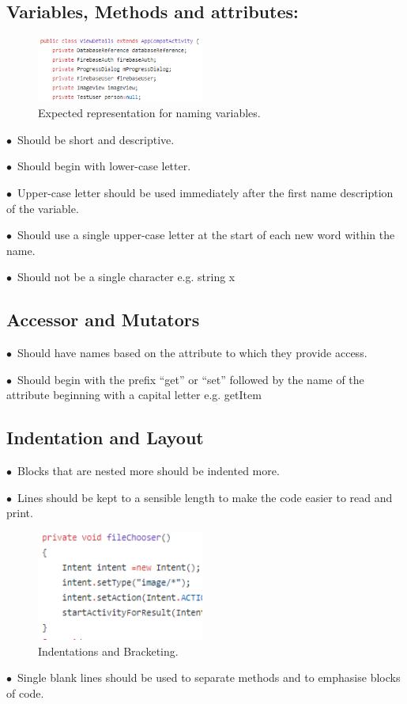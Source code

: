 \documentclass[english]{article}
\begin{document}
		\subsection{Variables, Methods and attributes:}
		\begin{figure}
			\caption{Expected representation for naming variables.}\label{wrap-fig:1}
			\includegraphics[width=5.5cm]{images/variables.png}
		\end{figure} 
			$\bullet$\ Should be short and descriptive.\par
			$\bullet$\ Should begin with lower-case letter.\par
$\bullet$\ Upper-case letter should be used immediately after the first name description of the variable.\par
$\bullet$\ Should use a single upper-case letter at the start of each new word within the name.\par
$\bullet$\ Should not be a single character e.g. string x  \par


                                	

		\subsection{Accessor and Mutators}
$\bullet$\  Should have names based on the attribute to which they provide access.\par
$\bullet$\ Should begin with the prefix “get” or “set” followed by the name of the attribute beginning with a capital letter e.g. getItem \par
				
		\subsection{Indentation and Layout}
		$\bullet$\ Blocks that are nested more should be indented more. \par
		
$\bullet$\ Lines should be kept to a sensible length to make the code easier to read and print.\par	
\begin{figure}
	\caption{Indentations and Bracketing.}
	\label{wrap-fig:2}
	\includegraphics[width=5.5cm]{images/indentation.png}
\end{figure} 
	$\bullet$\ Single blank lines should be used to separate methods and to emphasise blocks of code.\par	
		
\end{document}
